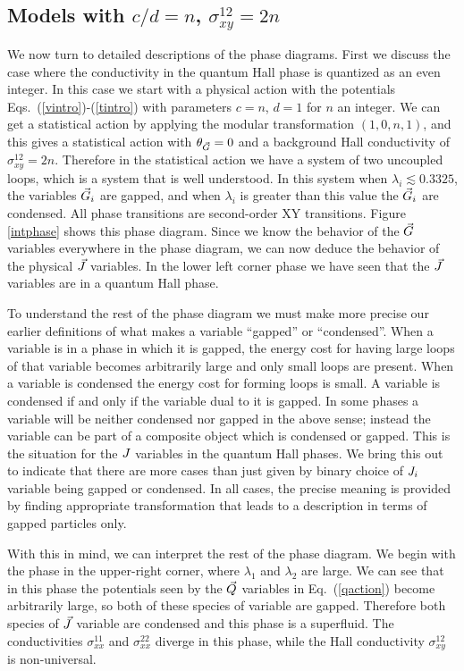 \subsection{Models with $c/d=n$, $\sigma^{12}_{xy}=2n$}
We now turn to detailed descriptions of the phase diagrams.
First we discuss the case where the conductivity in the quantum Hall phase is quantized as an even integer. In this case we start with a physical action with the potentials Eqs.~(\ref{vintro})-(\ref{tintro}) with parameters $c=n$, $d=1$ for $n$ an integer. We can get a statistical action by applying the modular transformation $(1, 0, n, 1)$, and this gives a statistical action with $\theta_{\vec{G}}=0$ and a background Hall conductivity of $\sigma^{12}_{xy}=2n$. Therefore in the statistical action we have a system of  two uncoupled loops, which is a system that is well understood.\cite{Cha1991,Sorensen} 
In this system when $\lambda_i\lesssim 0.3325$, the variables $\vec{G}_i$ are gapped, and when $\lambda_i$ is greater than this value the $\vec{G}_i$ are condensed. All phase transitions are second-order XY transitions. Figure \ref{intphase} shows this phase diagram. 
Since we know the behavior of the $\vec{G}$ variables everywhere in the phase diagram, we can now deduce the behavior of the physical $\vec{J}$ variables. In the lower left corner phase we have seen that the $\vec{J}$ variables are in a quantum Hall phase. 

To understand the rest of the phase diagram we must make more precise our earlier definitions of what makes a variable ``gapped'' or ``condensed''. When a variable is in a phase in which it is gapped, the energy cost for having large loops of that variable becomes arbitrarily large and only small loops are present. When a variable is condensed the energy cost for forming loops is small. A variable is condensed if and only if the variable dual to it is gapped. In some phases a variable will be neither condensed nor gapped in the above sense; instead the variable can be part of a composite object which is condensed or gapped. This is the situation for the $J$ variables in the quantum Hall phases. We bring this out to indicate that there are more cases than just given by binary choice of $J_i$ variable being gapped or condensed.  In all cases, the precise meaning is provided by finding appropriate transformation that leads to a description in terms of gapped particles only.

With this in mind, we can interpret the rest of the phase diagram. We begin with the phase in the upper-right corner, where $\lambda_1$ and $\lambda_2$ are large. We can see that in this phase the potentials seen by the $\vec{Q}$ variables in Eq.~(\ref{qaction}) become arbitrarily large, so both of these species of variable are gapped. Therefore both species of $\vec{J}$ variable are condensed and this phase is a superfluid. The conductivities $\sigma^{11}_{xx}$ and $\sigma^{22}_{xx}$ diverge in this phase, while the Hall conductivity $\sigma^{12}_{xy}$ is non-universal. 

